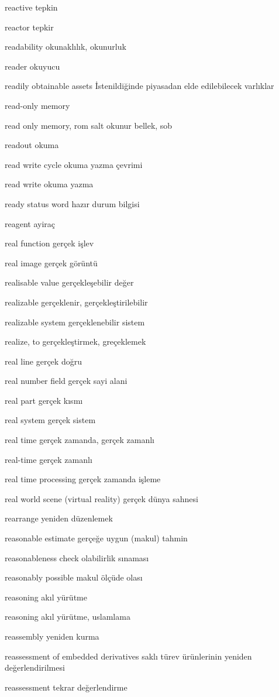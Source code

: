 \documentclass[12pt,fleqn]{article}\usepackage{../../common}
\begin{document}
reactive tepkin

reactor tepkir

readability okunaklılık, okunurluk

reader okuyucu

readily obtainable assets İstenildiğinde piyasadan elde edilebilecek varlıklar

read-only memory

read only memory, rom salt okunur bellek, sob

readout okuma

read write cycle okuma yazma çevrimi

read write okuma yazma

ready status word hazır durum bilgisi

reagent ayiraç

real function gerçek işlev

real image gerçek görüntü

realisable value gerçekleşebilir değer

realizable gerçeklenir, gerçekleştirilebilir

realizable system gerçeklenebilir sistem

realize, to gerçekleştirmek, greçeklemek

real line gerçek doğru

real number field gerçek sayi alani

real part gerçek kısmı

real system gerçek sistem

real time gerçek zamanda, gerçek zamanlı

real-time gerçek zamanlı

real time processing gerçek zamanda işleme

real world scene (virtual reality) gerçek dünya sahnesi

rearrange yeniden düzenlemek

reasonable estimate gerçeğe uygun (makul) tahmin

reasonableness check olabilirlik sınaması

reasonably possible makul ölçüde olası

reasoning akıl yürütme

reasoning akıl yürütme, uslamlama

reassembly yeniden kurma

reassessment of embedded derivatives saklı türev ürünlerinin yeniden değerlendirilmesi

reassessment tekrar değerlendirme
\end{document}
